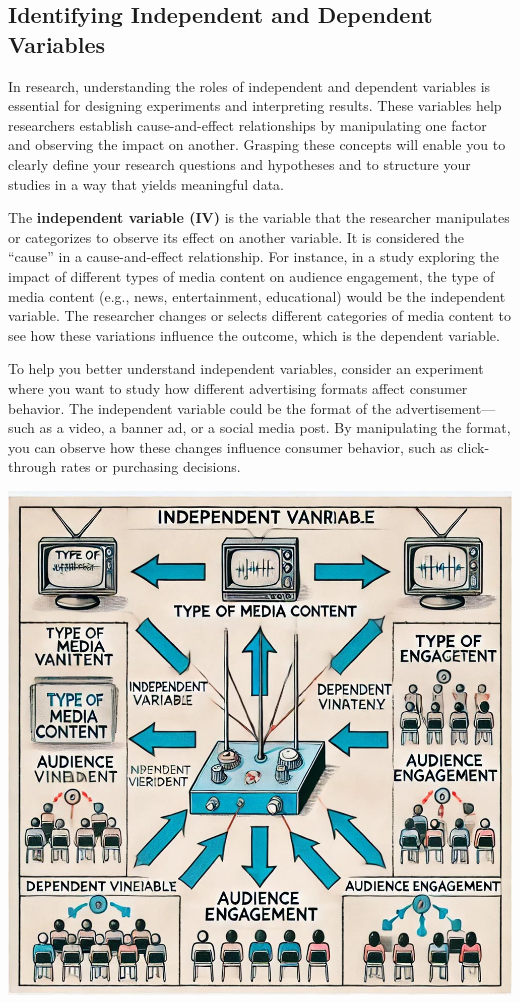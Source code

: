 \documentclass[
]{book}
\begin{document}
\subsection{Identifying Independent and Dependent Variables}\label{identifying-independent-and-dependent-variables}

In research, understanding the roles of independent and dependent variables is essential for designing experiments and interpreting results. These variables help researchers establish cause-and-effect relationships by manipulating one factor and observing the impact on another. Grasping these concepts will enable you to clearly define your research questions and hypotheses and to structure your studies in a way that yields meaningful data.

The \textbf{independent variable (IV)} is the variable that the researcher manipulates or categorizes to observe its effect on another variable. It is considered the ``cause'' in a cause-and-effect relationship. For instance, in a study exploring the impact of different types of media content on audience engagement, the type of media content (e.g., news, entertainment, educational) would be the independent variable. The researcher changes or selects different categories of media content to see how these variations influence the outcome, which is the dependent variable.

To help you better understand independent variables, consider an experiment where you want to study how different advertising formats affect consumer behavior. The independent variable could be the format of the advertisement---such as a video, a banner ad, or a social media post. By manipulating the format, you can observe how these changes influence consumer behavior, such as click-through rates or purchasing decisions.

\includegraphics[width=1\textwidth,height=\textheight]{images/fig023.jpg}
\end{document}
